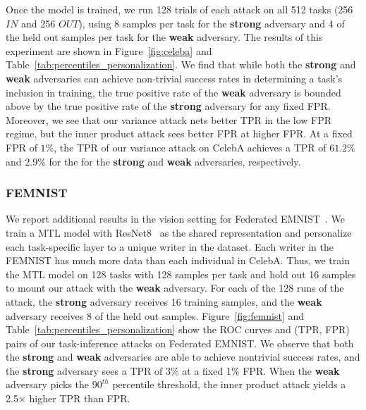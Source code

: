 Once the model is trained, we run 128 trials of each attack on all 512 tasks (256 $IN$ and 256 $OUT$), using 8 samples per task for the \textbf{strong} adversary and 4 of the held out samples per task for the \textbf{weak} adversary. The results of this experiment are shown in Figure~\ref{fig:celeba} and Table~\ref{tab:percentiles_personalization}. We find that while both the \textbf{strong} and \textbf{weak} adversaries can achieve non-trivial success rates in determining a task's inclusion in training, the true positive rate of the \textbf{weak} adversary is bounded above by the true positive rate of the \textbf{strong} adversary for any fixed FPR. Moreover, we see that our variance attack nets better TPR in the low FPR regime, but the inner product attack sees better FPR at higher FPR. At a fixed FPR of $1\%$, the TPR of our variance attack on CelebA achieves a TPR of $61.2\%$  and  $2.9\%$ for the for the \textbf{strong} and \textbf{weak} adversaries, respectively.


\subsubsection{FEMNIST} \label{sec:femnist}

We report additional results in the vision setting for Federated EMNIST~\cite{caldas-2019-leafbenchmark}. We train a MTL model with ResNet8~\cite{ResNet} as the shared representation and personalize each task-specific layer to a unique writer in the dataset. Each writer in the FEMNIST has much more data than each individual in CelebA. Thus, we train the MTL model on 128 tasks with 128 samples per task and hold out 16 samples to mount our attack with the \textbf{weak} adversary. For each of the 128 runs of the attack, the \textbf{strong} adversary receives 16 training samples, and the \textbf{weak} adversary receives 8 of the held out samples. Figure~\ref{fig:femnist} and Table~\ref{tab:percentiles_personalization} show the ROC curves and (TPR, FPR) pairs of our task-inference attacks on Federated EMNIST. We observe that both the \textbf{strong} and \textbf{weak} adversaries are able to achieve nontrivial success rates, and the \textbf{strong} adversary sees a TPR of 3\% at a fixed 1\% FPR. When the \textbf{weak} adversary picks the $90^{th}$ percentile threshold, the inner product attack yields a 2.5$\times$ higher TPR than FPR.






